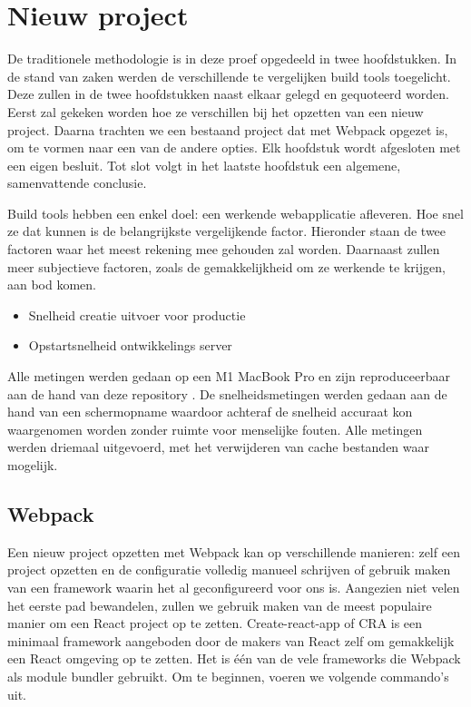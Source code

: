 \chapter{Nieuw project}

De traditionele methodologie is in deze proef opgedeeld in twee hoofdstukken. In de stand van zaken werden de verschillende te vergelijken build tools toegelicht. Deze zullen in de twee hoofdstukken naast elkaar gelegd en gequoteerd worden.
Eerst zal gekeken worden hoe ze verschillen bij het opzetten van een nieuw project. Daarna trachten we een bestaand project dat met Webpack opgezet is, om te vormen naar een van de andere opties. Elk hoofdstuk wordt afgesloten met een eigen besluit. Tot slot volgt in het laatste hoofdstuk een algemene, samenvattende conclusie.

Build tools hebben een enkel doel: een werkende webapplicatie afleveren. Hoe snel ze dat kunnen is de belangrijkste vergelijkende factor. Hieronder staan de twee factoren waar het meest rekening mee gehouden zal worden. Daarnaast zullen meer subjectieve factoren, zoals de gemakkelijkheid om ze werkende te krijgen, aan bod komen.

\begin{itemize}
   \item Snelheid creatie uitvoer voor productie
   \item Opstartsnelheid ontwikkelings server
\end{itemize}

Alle metingen werden gedaan op een M1 MacBook Pro en zijn reproduceerbaar aan de hand van deze repository \autocite{vansteenkiste-2021A}. De snelheidsmetingen werden gedaan aan de hand van een schermopname waardoor achteraf de snelheid accuraat kon waargenomen worden zonder ruimte voor menselijke fouten. Alle metingen werden driemaal uitgevoerd, met het verwijderen van cache bestanden waar mogelijk.

\section{Webpack}
Een nieuw project opzetten met Webpack kan op verschillende manieren: zelf een project opzetten en de configuratie volledig manueel schrijven of gebruik maken van een framework waarin het al geconfigureerd voor ons is. Aangezien niet velen het eerste pad bewandelen, zullen we gebruik maken van de meest populaire manier om een React project op te zetten. Create-react-app of CRA is een minimaal framework aangeboden door de makers van React zelf om gemakkelijk een React omgeving op te zetten. Het is één van de vele frameworks die Webpack als module bundler gebruikt. Om te beginnen, voeren we volgende commando’s uit.

